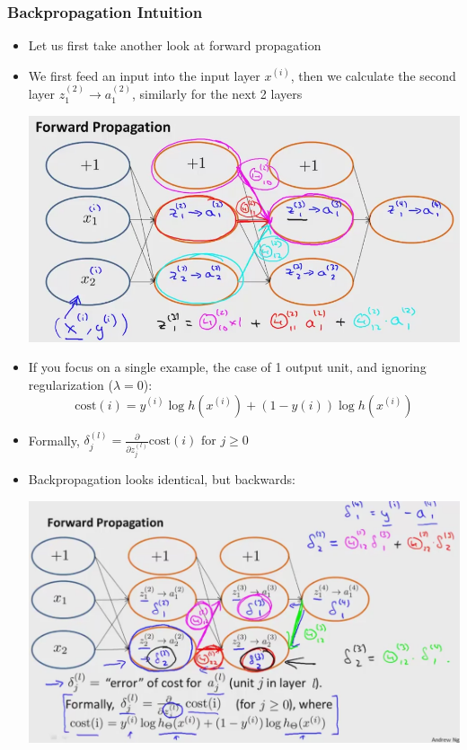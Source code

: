 \subsubsection{Backpropagation Intuition}
\begin{itemize}[--]
	\item Let us first take another look at forward propagation
	\item We first feed an input into the input layer $x^{(i)}$, then we calculate the second layer $z_1^{(2)}\to a_1^{(2)}$, similarly for the next 2 layers
	\begin{center}
		\includegraphics[scale=0.7]{sections/cs229/w6/forward_prop.png}
	\end{center}

	\item If you focus on a single example, the case of 1 output unit, and ignoring regularization ($\lambda = 0$): 
		$$\text{cost}(i)=y^{(i)}\log h(x^{(i)}) + (1-y{(i)} ) \log h(x^{(i)} )$$
	\item Formally, $\delta_j^{(l)}=\frac{\partial}{\partial z_j^{(l)}}\text{cost}(i)\text{ for } j\geq 0$
	\item Backpropagation looks identical, but backwards:
	\begin{center}
		\includegraphics[scale=0.25]{sections/cs229/w6/back_prop.png}
	\end{center}
\end{itemize}

